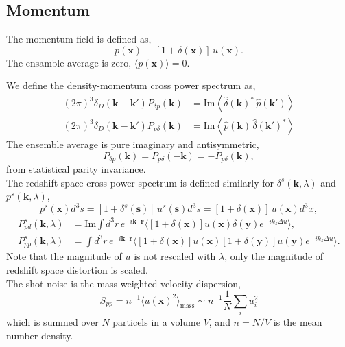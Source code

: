 \documentclass[a4paper,11pt, fleqn]{article}
\begin{document}
%
%
\vspace{5mm}
\subsection{Momentum}

The momentum field is defined as,
%
\begin{equation}
  p(\bm{x}) \equiv [1 + \delta(\bm{x})] \, u(\bm{x}).
\end{equation}
%
The ensamble average is zero, $\langle p(\bm{x}) \rangle = 0$.

We define the density-momentum cross power spectrum as,
\begin{align}
  (2\pi)^3 \delta_D(\bm{k} - \bm{k}') P_{\delta p}(\bm{k})
  &= \mathrm{Im} \left\langle
  \hat{\delta}(\bm{k})^* \, \hat{p}(\bm{k}')
  \right\rangle\\
%
  (2\pi)^3 \delta_D(\bm{k} - \bm{k}') P_{p \delta}(\bm{k})
  &= \mathrm{Im} \left\langle
  \hat{p}(\bm{k}) \, \hat{\delta}(\bm{k}')^*
  \right\rangle
\end{align}
The ensemble average is pure imaginary and antisymmetric,
%
\begin{equation}
  P_{\delta p}(\bm{k}) = P_{p \delta}(-\bm{k})
  = -P_{p \delta}(\bm{k}),
\end{equation}
from statistical parity invariance.\\

The redshift-space cross power spectrum is defined similarly for $\delta^s(\bm{k}, \lambda)$ and $p^s(\bm{k}, \lambda)$,
%
\begin{equation}
  p^s(\bm{x}) d^3 s = [1 + \delta^s(\bm{s})] \,u^s(\bm{s}) d^3 s
    = [1 + \delta(\bm{x}) ] \, u(\bm{x}) d^3 x,
\end{equation}
%
\begin{align}
  P^s_{pd}(\bm{k}, \lambda) &= \mathrm{Im}
  \int\! d^3 r \, e^{-i \bm{k}\cdot\bm{r}}
  \Big\langle
  [ 1 + \delta(\bm{x}) ] u(\bm{x}) \delta(\bm{y})
  e^{-i k_z \Delta u} \Big\rangle,\\
%
  P^s_{pp}(\bm{k}, \lambda) &= 
  \int\! d^3 r \, e^{-i \bm{k}\cdot\bm{r}}
  \Big\langle
  [ 1 + \delta(\bm{x}) ] u(\bm{x}) [ 1 + \delta(\bm{y}) ] u(\bm{y})
  e^{-i k_z \Delta u} \Big\rangle.  
\end{align}
%
Note that the magnitude of $u$ is not rescaled with $\lambda$, only the
magnitude of redshift space distortion is scaled.\\


The shot noise is the mass-weighted velocity dispersion,
\begin{equation}
  S_{pp} = \bar{n}^{-1} \langle u(\bm{x})^2 \rangle_\mathrm{mass}
        \sim \bar{n}^{-1} \frac{1}{N} \sum_i u_i^2
\end{equation}
which is summed over $N$ particels in a volume $V$, and
$\bar{n} = N/V$ is the mean number density.
\end{document}

